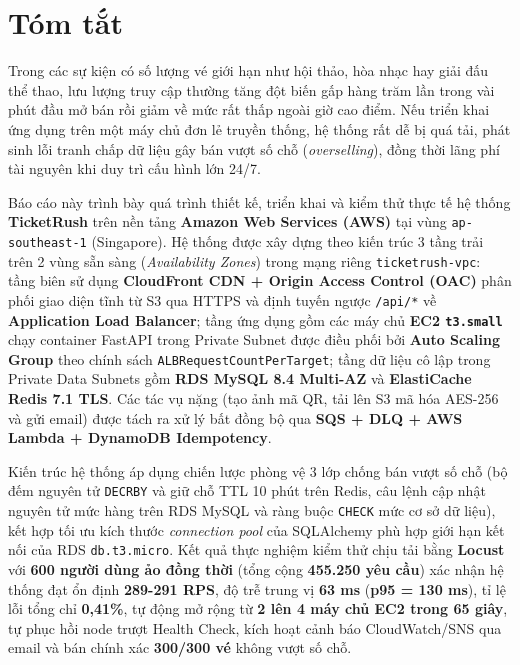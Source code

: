 \chapter*{Tóm tắt}

Trong các sự kiện có số lượng vé giới hạn như hội thảo, hòa nhạc hay giải đấu thể thao, lưu lượng truy cập thường tăng đột biến gấp hàng trăm lần trong vài phút đầu mở bán rồi giảm về mức rất thấp ngoài giờ cao điểm. Nếu triển khai ứng dụng trên một máy chủ đơn lẻ truyền thống, hệ thống rất dễ bị quá tải, phát sinh lỗi tranh chấp dữ liệu gây bán vượt số chỗ (\textit{overselling}), đồng thời lãng phí tài nguyên khi duy trì cấu hình lớn 24/7.

Báo cáo này trình bày quá trình thiết kế, triển khai và kiểm thử thực tế hệ thống \textbf{TicketRush} trên nền tảng \textbf{Amazon Web Services (AWS)} tại vùng \texttt{ap-southeast-1} (Singapore). Hệ thống được xây dựng theo kiến trúc 3 tầng trải trên 2 vùng sẵn sàng (\textit{Availability Zones}) trong mạng riêng \texttt{ticketrush-vpc}: tầng biên sử dụng \textbf{CloudFront CDN + Origin Access Control (OAC)} phân phối giao diện tĩnh từ S3 qua HTTPS và định tuyến ngược \texttt{/api/*} về \textbf{Application Load Balancer}; tầng ứng dụng gồm các máy chủ \textbf{EC2 \texttt{t3.small}} chạy container FastAPI trong Private Subnet được điều phối bởi \textbf{Auto Scaling Group} theo chính sách \texttt{ALBRequestCountPerTarget}; tầng dữ liệu cô lập trong Private Data Subnets gồm \textbf{RDS MySQL 8.4 Multi-AZ} và \textbf{ElastiCache Redis 7.1 TLS}. Các tác vụ nặng (tạo ảnh mã QR, tải lên S3 mã hóa AES-256 và gửi email) được tách ra xử lý bất đồng bộ qua \textbf{SQS + DLQ + AWS Lambda + DynamoDB Idempotency}.

Kiến trúc hệ thống áp dụng chiến lược phòng vệ 3 lớp chống bán vượt số chỗ (bộ đếm nguyên tử \texttt{DECRBY} và giữ chỗ TTL 10 phút trên Redis, câu lệnh cập nhật nguyên tử mức hàng trên RDS MySQL và ràng buộc \texttt{CHECK} mức cơ sở dữ liệu), kết hợp tối ưu kích thước \textit{connection pool} của SQLAlchemy phù hợp giới hạn kết nối của RDS \texttt{db.t3.micro}. Kết quả thực nghiệm kiểm thử chịu tải bằng \textbf{Locust} với \textbf{600 người dùng ảo đồng thời} (tổng cộng \textbf{455.250 yêu cầu}) xác nhận hệ thống đạt ổn định \textbf{289-291 RPS}, độ trễ trung vị \textbf{63 ms} (\textbf{p95 = 130 ms}), tỉ lệ lỗi tổng chỉ \textbf{0,41\%}, tự động mở rộng từ \textbf{2 lên 4 máy chủ EC2 trong 65 giây}, tự phục hồi node trượt Health Check, kích hoạt cảnh báo CloudWatch/SNS qua email và bán chính xác \textbf{300/300 vé} không vượt số chỗ.

